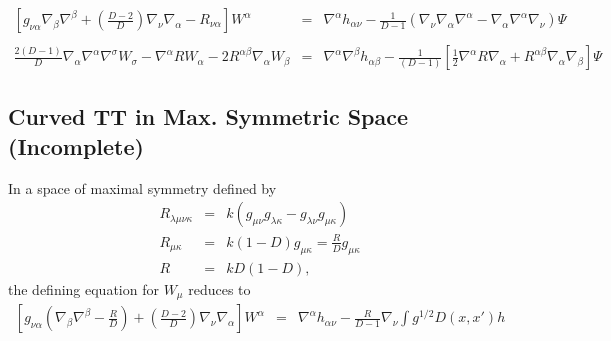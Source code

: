 \documentclass[10pt,letterpaper]{article}
\numberwithin{equation}{section}
\begin{document}
\begin{eqnarray}
\left[g_{\nu\alpha}\nabla_\beta\nabla^\beta + \left(\frac{D-2}{D}\right)\nabla_\nu \nabla_\alpha - R_{\nu\alpha}\right]W^\alpha &=&
\nabla^\alpha h_{\alpha\nu} - \frac{1}{D-1}\left(\nabla_\nu \nabla_\alpha\nabla^\alpha - \nabla_\alpha\nabla^\alpha \nabla_\nu\right)
\Psi
\\\nonumber \\
\frac{2(D-1)}{D}\nabla_\alpha\nabla^\alpha \nabla^\sigma W_\sigma - \nabla^\alpha R W_\alpha - 2R^{\alpha\beta} \nabla_\alpha W_{\beta} &=& 
\nabla^\alpha\nabla^\beta h_{\alpha\beta} - \frac{1}{(D-1)}\left[ \tfrac12 \nabla^\alpha R \nabla_\alpha + R^{\alpha\beta}\nabla_\alpha\nabla_\beta\right]\Psi
\end{eqnarray}
\subsection{Curved TT in Max. Symmetric Space (Incomplete)}
In a space of maximal symmetry defined by
\begin{eqnarray}
R_{\lambda\mu\nu\kappa} &=& k(g_{\mu\nu}g_{\lambda\kappa}-g_{\lambda\nu}g_{\mu\kappa})
\nonumber\\
R_{\mu\kappa} &=& k(1-D)g_{\mu\kappa} = \frac{R}{D}g_{\mu\kappa}
\nonumber\\
R&=& kD(1-D), 
\end{eqnarray}
the defining equation for $W_{\mu}$ reduces to
\begin{eqnarray}
\left[g_{\nu\alpha}\left(\nabla_\beta\nabla^\beta -\frac{R}{D}\right)+ \left(\frac{D-2}{D}\right)\nabla_\nu \nabla_\alpha\right]W^\alpha
&=& \nabla^\alpha h_{\alpha\nu} - \frac{R}{D-1}\nabla_\nu \int g^{1/2} D(x,x') h
\end{eqnarray}
%
%
\end{document}
